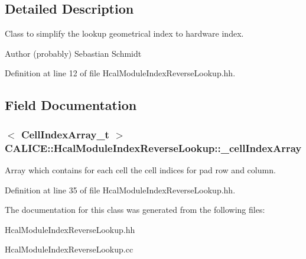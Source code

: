 \subsection{Detailed Description}
Class to simplify the lookup geometrical index to hardware index. \begin{DoxyAuthor}{Author}
(probably) Sebastian Schmidt 
\end{DoxyAuthor}


Definition at line 12 of file HcalModuleIndexReverseLookup.hh.

\subsection{Field Documentation}
\subsubsection[{\_\-cellIndexArray}]{$<$ {\bf CellIndexArray\_\-t} $>$ {\bf CALICE::HcalModuleIndexReverseLookup::\_\-cellIndexArray}\hspace{0.3cm}{\ttfamily  [protected]}}\label{classCALICE_1_1HcalModuleIndexReverseLookup_a28b33f49d28d85e2fed000e524429e24}


Array which contains for each cell the cell indices for pad row and column. 

Definition at line 35 of file HcalModuleIndexReverseLookup.hh.

The documentation for this class was generated from the following files:\begin{DoxyCompactItemize}
\item 
HcalModuleIndexReverseLookup.hh\item 
HcalModuleIndexReverseLookup.cc\end{DoxyCompactItemize}
